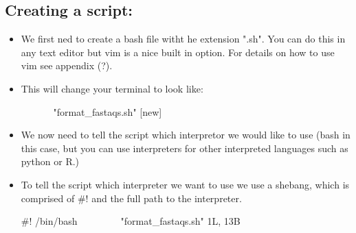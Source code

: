 \documentclass{article}
\begin{document}
\subsection*{Creating a script:}
\begin{itemize}
	\item We first ned to create a bash file witht he extension ".sh". You can do this in any text editor but vim is a nice built in option. For details on how to use vim see appendix (?).
	\item This will change your terminal to look like:
	\begin{vim}
	~
	~
	~
	~
	"format_fastaqs.sh" [new]
	\end{vim}
	\item We now need to tell the script which interpretor we would like to use (bash in this case, but you can use interpreters for other interpreted languages such as python or R.)
	\item To tell the script which interpreter we want to use we use a shebang, which is comprised of \#! and the full path to the interpreter.
	\begin{vim}
	#! /bin/bash
	~                                                                                                                                                                                                                               
	~                                                                                                                                                                                                                               
	~                                                                                                                                                                                                                               
	~                                                                                                                                                                                                                               
	~                                                                                                                                                                                                                                                                                                                                                                                                                                                             
	"format_fastaqs.sh" 1L, 13B
	\end{vim}
\end{itemize}
\end{document}
